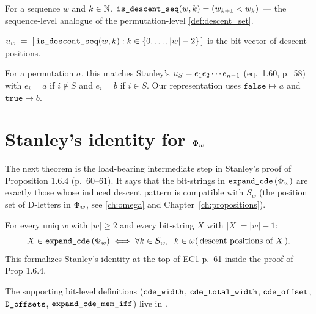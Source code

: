 \begin{definition}
  \label{def:is_descent_seq}
  \rocqok
  For a sequence $w$ and $k \in \mathbb{N}$,
  $\texttt{is\_descent\_seq}(w, k) = (w_{k+1} < w_k)$ — the
  sequence-level analogue of the permutation-level
  \cref{def:descent_set}.
\end{definition}

\begin{definition}
  \label{def:char_mono}
  \rocqok
  $u_{w} \;=\; [\,\texttt{is\_descent\_seq}(w, k) : k \in \{0,
  \dots, |w| - 2\}\,]$ is the bit-vector of descent positions.

  For a permutation $\sigma$, this matches Stanley's $u_{S} =
  e_1 e_2 \cdots e_{n-1}$ (eq.~1.60, p.~58) with $e_i = a$ if
  $i \notin S$ and $e_i = b$ if $i \in S$.  Our representation uses
  $\mathtt{false} \mapsto a$ and $\mathtt{true} \mapsto b$.
\end{definition}

\section{Stanley's identity for $\Phi_{w}$}

The next theorem is the load-bearing intermediate step in Stanley's
proof of Proposition 1.6.4 (p.~60--61).  It says that the bit-strings
in $\texttt{expand\_cde}\,(\Phi_{w})$ are exactly those whose induced
descent pattern is compatible with $S_w$ (the position set of D-letters
in $\Phi_{w}$, see \cref{ch:omega} and
Chapter~\ref{ch:propositions}).

\begin{theorem}[Stanley's $\PhiW{w} = \sum_{\omegaSet{X} \supseteq S_w} \charmono{X}$]
  \label{thm:phi_w_support_general}
  \rocqok
  For every uniq $w$ with $|w| \geq 2$ and every bit-string $X$ with
  $|X| = |w| - 1$:
  \[
    X \in \texttt{expand\_cde}\,(\Phi_{w})
    \;\Longleftrightarrow\;
    \forall k \in S_w,\;\;
       k \in \omega(\,\text{descent positions of }X\,).
  \]
  This formalizes Stanley's identity at the top of EC1 p.~61
  inside the proof of Prop 1.6.4.

  The supporting bit-level definitions
  ($\texttt{cde\_width}$, $\texttt{cde\_total\_width}$,
  $\texttt{cde\_offset}$, $\texttt{D\_offsets}$,
  $\texttt{expand\_cde\_mem\_iff}$) live in
  .
\end{theorem}

